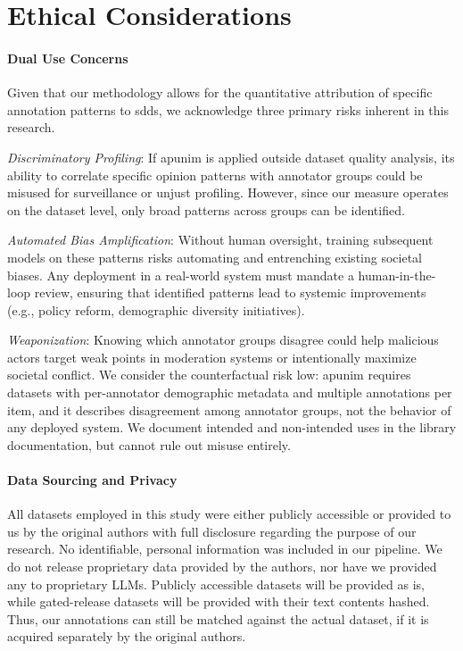 \documentclass[manuscript,screen,review,anonymous]{acmart}
\theoremstyle{acmplain}
\theoremstyle{researchquestionstyle}
\begin{document}
\section*{Ethical Considerations}
\label{sec:ethics}

\paragraph{Dual Use Concerns} Given that our methodology allows for the quantitative attribution of specific annotation patterns to \acp{sdd}, we acknowledge three primary risks inherent in this research.
\begin{enumerate*}
	\item \emph{Discriminatory Profiling}: If apunim is applied outside dataset quality analysis, its ability to correlate specific opinion patterns with annotator groups could be misused for surveillance or unjust profiling. However, since our measure operates on the dataset level, only broad patterns across groups can be identified.
	\item \emph{Automated Bias Amplification}: Without human oversight, training subsequent models on these patterns risks automating and entrenching existing societal biases. Any deployment in a real-world system must mandate a human-in-the-loop review, ensuring that identified patterns lead to systemic improvements (e.g., policy reform, demographic diversity initiatives).
	\item \emph{Weaponization}: Knowing which annotator groups disagree could help malicious actors target weak points in moderation systems or intentionally maximize societal conflict. We consider the counterfactual risk low: apunim requires datasets with per-annotator demographic metadata and multiple annotations per item, and it describes disagreement among annotator groups, not the behavior of any deployed system. We document intended and non-intended uses in the library documentation, but cannot rule out misuse entirely.
\end{enumerate*}

\paragraph{Data Sourcing and Privacy} All datasets employed in this study were either publicly accessible or provided to us by the original authors with full disclosure regarding the purpose of our research. No identifiable, personal information was included in our pipeline. We do not release proprietary data provided by the authors, nor have we provided any to proprietary LLMs. Publicly accessible datasets will be provided as is, while gated-release datasets will be provided with their text contents hashed. Thus, our annotations can still be matched against the actual dataset, if it is acquired separately by the original authors.
\end{document}
